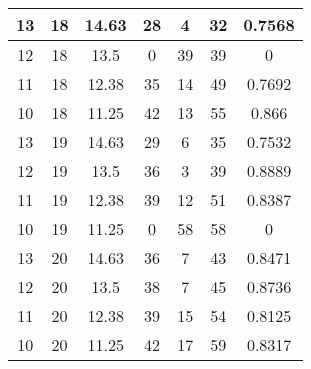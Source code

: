 \documentclass[letterpaper, 12pt]{article}
\begin{document}
\begin{longtable}{|c|c|c|c|c|c|c|}
\hline
13 & 18 & 14.63 & 28 & 4 & 32 & 0.7568 \\
\hline
12 & 18 & 13.5 & 0 & 39 & 39 & 0 \\
\hline
11 & 18 & 12.38 & 35 & 14 & 49 & 0.7692 \\
\hline
10 & 18 & 11.25 & 42 & 13 & 55 & 0.866 \\
\hline
13 & 19 & 14.63 & 29 & 6 & 35 & 0.7532 \\
\hline
12 & 19 & 13.5 & 36 & 3 & 39 & 0.8889 \\
\hline
11 & 19 & 12.38 & 39 & 12 & 51 & 0.8387 \\
\hline
10 & 19 & 11.25 & 0 & 58 & 58 & 0 \\
\hline
13 & 20 & 14.63 & 36 & 7 & 43 & 0.8471 \\
\hline
12 & 20 & 13.5 & 38 & 7 & 45 & 0.8736 \\
\hline
11 & 20 & 12.38 & 39 & 15 & 54 & 0.8125 \\
\hline
10 & 20 & 11.25 & 42 & 17 & 59 & 0.8317 \\
\hline
\end{longtable}
\end{document}
